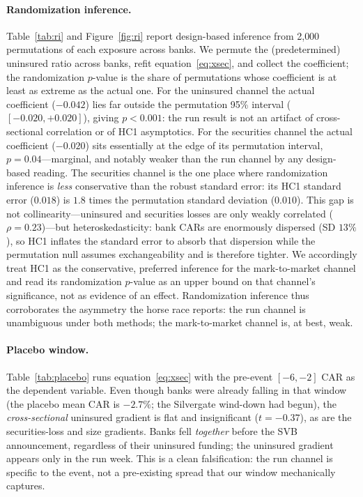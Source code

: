 \documentclass[12pt]{article}
\begin{document}
\paragraph{Randomization inference.} Table~\ref{tab:ri} and Figure~\ref{fig:ri} report
design-based inference from 2{,}000 permutations of each exposure across banks. We permute
the (predetermined) uninsured ratio across banks, refit equation~\eqref{eq:xsec}, and
collect the coefficient; the randomization $p$-value is the share of permutations whose
coefficient is at least as extreme as the actual one. For the uninsured channel the actual
coefficient ($-0.042$) lies far outside the permutation 95\% interval
($[-0.020,+0.020]$), giving $p<0.001$: the run result is not an artifact of cross-sectional
correlation or of HC1 asymptotics. For the securities channel the actual coefficient
($-0.020$) sits essentially at the edge of its permutation interval, $p=0.04$---marginal, and
notably weaker than the run channel by any design-based reading. The securities channel is the
one place where randomization inference is \emph{less} conservative than the robust standard
error: its HC1 standard error ($0.018$) is $1.8$ times the permutation standard deviation
($0.010$). This gap is not collinearity---uninsured and securities losses are only weakly
correlated ($\rho=0.23$)---but heteroskedasticity: bank CARs are enormously dispersed (SD
$13\%$), so HC1 inflates the standard error to absorb that dispersion while the permutation
null assumes exchangeability and is therefore tighter. We accordingly treat HC1 as the
conservative, preferred inference for the mark-to-market channel and read its randomization
$p$-value as an upper bound on that channel's significance, not as evidence of an effect.
Randomization inference thus corroborates the asymmetry the horse race reports: the run channel
is unambiguous under both methods; the mark-to-market channel is, at best, weak.

\paragraph{Placebo window.} Table~\ref{tab:placebo} runs equation~\eqref{eq:xsec} with the
pre-event $[-6,-2]$ CAR as the dependent variable. Even though banks were already falling in
that window (the placebo mean CAR is $-2.7\%$; the Silvergate wind-down had begun), the
\emph{cross-sectional} uninsured gradient is flat and insignificant ($t=-0.37$), as are the
securities-loss and size gradients. Banks fell \emph{together} before the SVB announcement,
regardless of their uninsured funding; the uninsured gradient appears only in the run week.
This is a clean falsification: the run channel is specific to the event, not a pre-existing
spread that our window mechanically captures.
\end{document}
